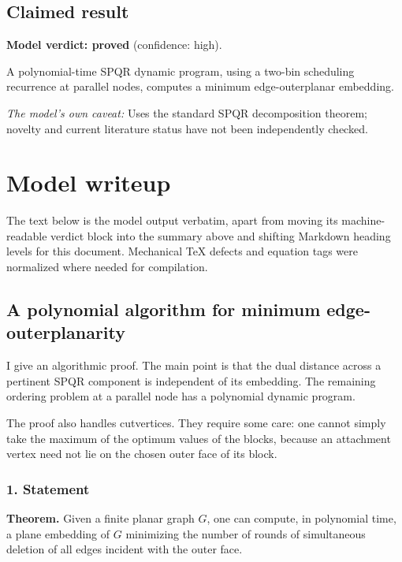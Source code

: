 \documentclass[
  11pt,
  a4paper,
]{article}
\begin{document}
\subsection{Claimed result}\label{claimed-result}

\textbf{Model verdict: proved} (confidence: high).

A polynomial-time SPQR dynamic program, using a two-bin scheduling
recurrence at parallel nodes, computes a minimum edge-outerplanar
embedding.

\emph{The model's own caveat:} Uses the standard SPQR decomposition
theorem; novelty and current literature status have not been
independently checked.

\section{Model writeup}\label{model-writeup}

The text below is the model output verbatim, apart from moving its
machine-readable verdict block into the summary above and shifting
Markdown heading levels for this document. Mechanical TeX defects and
equation tags were normalized where needed for compilation.

\subsection{A polynomial algorithm for minimum
edge-outerplanarity}\label{a-polynomial-algorithm-for-minimum-edge-outerplanarity}

I give an algorithmic proof. The main point is that the dual distance
across a pertinent SPQR component is independent of its embedding. The
remaining ordering problem at a parallel node has a polynomial dynamic
program.

The proof also handles cutvertices. They require some care: one cannot
simply take the maximum of the optimum values of the blocks, because an
attachment vertex need not lie on the chosen outer face of its block.

\subsubsection{1. Statement}\label{statement}

\textbf{Theorem.} Given a finite planar graph \(G\), one can compute, in
polynomial time, a plane embedding of \(G\) minimizing the number of
rounds of simultaneous deletion of all edges incident with the outer
face.
\end{document}
